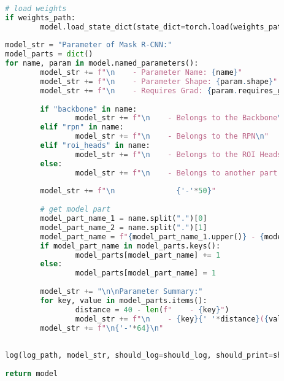 \begin{lstlisting}[language=Python,caption=Loading function of Mask R-CNN using torchvision, label=lst:model-loading]
		
		# load weights
		if weights_path:
				model.load_state_dict(state_dict=torch.load(weights_path, weights_only=True)) 
		
		model_str = "Parameter of Mask R-CNN:"
		model_parts = dict()
		for name, param in model.named_parameters():
				model_str += f"\n    - Parameter Name: {name}"
				model_str += f"\n    - Parameter Shape: {param.shape}"
				model_str += f"\n    - Requires Grad: {param.requires_grad}"
				
				if "backbone" in name:
						model_str += f"\n    - Belongs to the Backbone\n"
				elif "rpn" in name:
						model_str += f"\n    - Belongs to the RPN\n"
				elif "roi_heads" in name:
						model_str += f"\n    - Belongs to the ROI Heads\n"
				else:
						model_str += f"\n    - Belongs to another part of the model\n"
				
				model_str += f"\n              {'-'*50}"
				
				# get model part
				model_part_name_1 = name.split(".")[0]
				model_part_name_2 = name.split(".")[1]
				model_part_name = f"{model_part_name_1.upper()} - {model_part_name_2.upper()}"
				if model_part_name in model_parts.keys():
						model_parts[model_part_name] += 1
				else:
						model_parts[model_part_name] = 1
				
				model_str += "\n\nParameter Summary:"
				for key, value in model_parts.items():
						distance = 40 - len(f"    - {key}")
						model_str += f"\n    - {key}{' '*distance}({value} parameters)"
				model_str += f"\n{'-'*64}\n"
		
		
		log(log_path, model_str, should_log=should_log, should_print=should_print)
		
		return model
		\end{lstlisting}
		
